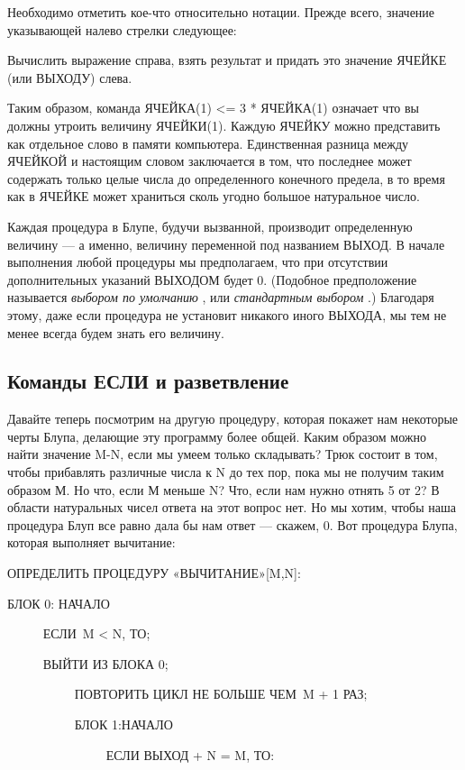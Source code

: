 \documentclass[../main.tex]{subfiles}
\begin{document}
Необходимо отметить кое-что относительно нотации. Прежде всего, значение указывающей налево стрелки следующее:

Вычислить выражение справа, взять результат и придать это значение ЯЧЕЙКЕ (или ВЫХОДУ) слева.

Таким образом, команда ЯЧЕЙКА(1) \textless= 3 * ЯЧЕЙКА(1) означает что вы должны утроить величину ЯЧЕЙКИ(1). Каждую ЯЧЕЙКУ можно представить как отдельное слово в памяти компьютера. Единственная разница между ЯЧЕЙКОЙ и настоящим словом заключается в том, что последнее может содержать только целые числа до определенного конечного предела, в то время как в ЯЧЕЙКЕ может храниться сколь угодно большое натуральное число.

Каждая процедура в Блупе, будучи вызванной, производит определенную величину --- а именно, величину переменной под названием ВЫХОД\@. В начале выполнения любой процедуры мы предполагаем, что при отсутствии дополнительных указаний ВЫХОДОМ будет 0. (Подобное предположение называется \emph{выбором по умолчанию} , или \emph{стандартным выбором} .) Благодаря этому, даже если процедура не установит никакого иного ВЫХОДА, мы тем не менее всегда будем знать его величину.


\subsection{Команды ЕСЛИ и разветвление}

Давайте теперь посмотрим на другую процедуру, которая покажет нам некоторые черты Блупа, делающие эту программу более общей. Каким образом можно найти значение M-N, если мы умеем только складывать? Трюк состоит в том, чтобы прибавлять различные числа к N до тех пор, пока мы не получим таким образом М\@. Но что, если М меньше N? Что, если нам нужно отнять 5 от 2? В области натуральных чисел ответа на этот вопрос нет. Но мы хотим, чтобы наша процедура Блуп все равно дала бы нам ответ --- скажем, 0. Вот процедура Блупа, которая выполняет вычитание:

ОПРЕДЕЛИТЬ ПРОЦЕДУРУ «ВЫЧИТАНИЕ»{[}M,N{]}:

БЛОК 0: НАЧАЛО

~~~~~ ЕСЛИ~M \textless{} N, ТО;

~~~~~ ВЫЙТИ ИЗ БЛОКА 0;

~~~~~~~~~~ ПОВТОРИТЬ ЦИКЛ НЕ БОЛЬШЕ ЧЕМ~M + 1 РАЗ;

~~~~~~~~~~ БЛОК 1:НАЧАЛО

~~~~~~~~~~~~~~~ ЕСЛИ ВЫХОД + N = M, ТО:
\end{document}
